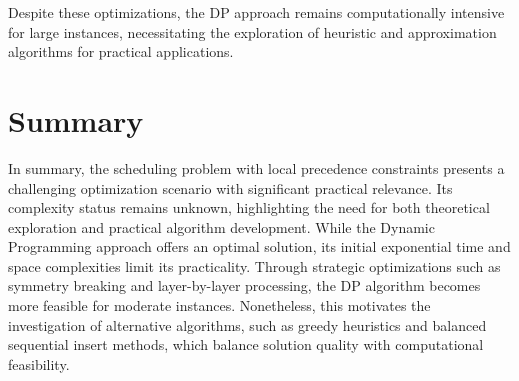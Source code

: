 Despite these optimizations, the DP approach remains computationally intensive for large instances, necessitating the exploration of heuristic and approximation algorithms for practical applications.


\section{Summary}

In summary, the scheduling problem with local precedence constraints presents a challenging optimization scenario with significant practical relevance. Its complexity status remains unknown, highlighting the need for both theoretical exploration and practical algorithm development. While the Dynamic Programming approach offers an optimal solution, its initial exponential time and space complexities limit its practicality. Through strategic optimizations such as symmetry breaking and layer-by-layer processing, the DP algorithm becomes more feasible for moderate instances. Nonetheless, this motivates the investigation of alternative algorithms, such as greedy heuristics and balanced sequential insert methods, which balance solution quality with computational feasibility.
